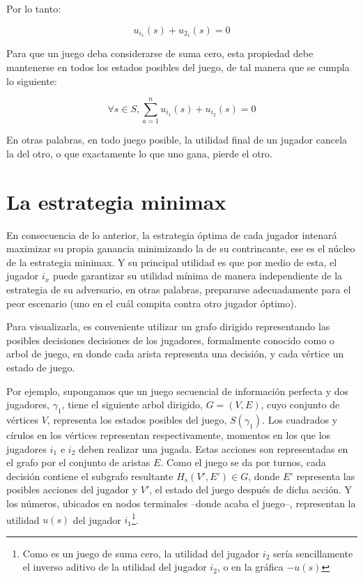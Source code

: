 Por lo tanto:

\begin{equation}
u_{i_{1}}(s)+u_{2_{1}}(s) = 0
\end{equation}

Para que un juego deba considerarse de suma cero, esta propiedad debe mantenerse en todos los estados posibles del juego, de tal manera que se cumpla lo siguiente:

\begin{equation}
\forall s \in S, \sum_{a=1}^{n}{u_{i_{1}}(s)}+{u_{i_{2}}(s)}=0
\end{equation}

En otras palabras, en todo juego posible, la utilidad final de un jugador cancela la del otro, o que exactamente lo que uno gana, pierde el otro.

\section{La estrategia minimax}
En consecuencia de lo anterior, la estrategia óptima de cada jugador intenará maximizar su propia ganancia minimizando la de su contrincante, ese es el núcleo de la estrategia minimax. Y su principal utilidad es que por medio de esta, el jugador $i_{x}$ puede garantizar su utilidad mínima de manera independiente de la estrategia de su adversario, en otras palabras, prepararse adecuadamente para el peor escenario (uno en el cuál compita contra otro jugador óptimo).

Para visualizarla, es conveniente utilizar un grafo dirigido representando las posibles decisiones decisiones de los jugadores, formalmente conocido como o arbol de juego, en donde cada arista representa una decisión, y cada vértice un estado de juego. 


Por ejemplo, supongamos que un juego secuencial de información perfecta y  dos jugadores, $\gamma_{1}$, tiene el siguiente arbol dirigido, $G = (V,E)$, cuyo conjunto de vértices $V$, representa los  estados posibles del juego, $S(\gamma_{1})$. Los cuadrados y círulos en los vértices representan respectivamente, momentos en los  que los jugadores $i_{1}$ e $i_{2}$ deben realizar una jugada. 
Estas acciones son representadas en el grafo por el conjunto de aristas $E$. Como el juego se da por turnos, cada decisión contiene el subgrafo resultante $H_{s}(V',E') \in G$, donde $E'$ representa las posibles acciones del jugador y $V'$, el estado del juego después de dicha acción. Y los números, ubicados en nodos terminales --donde acaba el juego--, representan la utilidad $u(s)$ del jugador $i_{1}$\footnote{Como es un juego de suma cero, la utilidad del jugador $i_{2}$ sería sencillamente el inverso aditivo de la utilidad del jugador $i_{2}$, o en la gráfica $-u(s)$}. 

